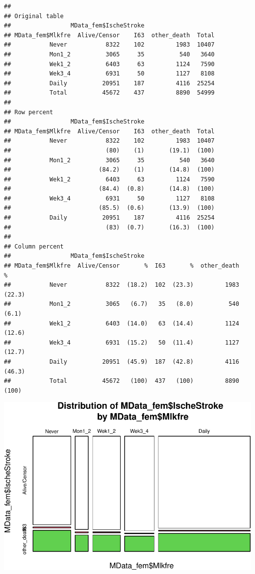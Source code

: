 \documentclass[
]{article}
\begin{document}
\begin{verbatim}
## 
## Original table 
##                 MData_fem$IscheStroke
## MData_fem$Mlkfre  Alive/Censor    I63  other_death  Total
##           Never           8322    102         1983  10407
##           Mon1_2          3065     35          540   3640
##           Wek1_2          6403     63         1124   7590
##           Wek3_4          6931     50         1127   8108
##           Daily          20951    187         4116  25254
##           Total          45672    437         8890  54999
## 
## Row percent 
##                 MData_fem$IscheStroke
## MData_fem$Mlkfre  Alive/Censor    I63  other_death  Total
##           Never           8322    102         1983  10407
##                           (80)    (1)       (19.1)  (100)
##           Mon1_2          3065     35          540   3640
##                         (84.2)    (1)       (14.8)  (100)
##           Wek1_2          6403     63         1124   7590
##                         (84.4)  (0.8)       (14.8)  (100)
##           Wek3_4          6931     50         1127   8108
##                         (85.5)  (0.6)       (13.9)  (100)
##           Daily          20951    187         4116  25254
##                           (83)  (0.7)       (16.3)  (100)
## 
## Column percent 
##                 MData_fem$IscheStroke
## MData_fem$Mlkfre  Alive/Censor       %  I63       %  other_death       %
##           Never           8322  (18.2)  102  (23.3)         1983  (22.3)
##           Mon1_2          3065   (6.7)   35   (8.0)          540   (6.1)
##           Wek1_2          6403  (14.0)   63  (14.4)         1124  (12.6)
##           Wek3_4          6931  (15.2)   50  (11.4)         1127  (12.7)
##           Daily          20951  (45.9)  187  (42.8)         4116  (46.3)
##           Total          45672   (100)  437   (100)         8890   (100)
\end{verbatim}

\includegraphics{traditionalPH_files/figure-latex/unnamed-chunk-35-1.pdf}
\end{document}
